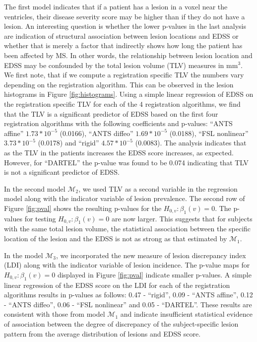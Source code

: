 \documentclass[10pt]{article}
\begin{document}
The first model indicates that if a patient has a lesion in a voxel near the ventricles, their disease
severity score may be higher than if they do not have a lesion. An
interesting question is whether the lower p-values in the last
analysis are indication of structural association between lesion
locations and EDSS or whether that is merely a factor that indirectly shows
how long the patient has been affected by MS. In other words, the
relationship between lesion location and EDSS may be confounded by
the total lesion volume (TLV) measures in mm$^3$. We first note, that if we compute a registration specific TLV the numbers vary depending on the registration algorithm. This can be observed in the lesion histograms in Figure \ref{fig:histograms}. Using a simple linear regression of EDSS on the registration specific TLV for each of the 4 registration algorithms, we find that the TLV is a significant predictor of EDSS
based on the first four registration algorithms with the following
coefficients and p-values: ``ANTS affine'' $1.73*10^{-5}$ (0.0166),
``ANTS diffeo'' $1.69*10^{-5}$ (0.0188), ``FSL nonlinear''
$3.73*10^{-5}$ (0.0178) and ``rigid'' $4.57*10^{-5}$ (0.0083). The
analysis indicates that as the TLV in the patients increases the
EDSS score increases, as expected. However, for ``DARTEL'' the p-value was found to be 0.074 indicating that TLV is not a significant predictor of EDSS. 

In the second model $\mathcal{M}_2$, we used  TLV as a second
variable in the regression model along with the indicator variable
of lesion prevalence. The second row of Figure \ref{fig:pval} shows
the resulting p-values for the $H_{0,v}:\beta_1(v)=0$. The p-values
for testing $H_{0,v}:\beta_1(v)=0$ are now larger. This suggests
that for subjects with the same total lesion volume, the statistical association
between the specific location of the lesion and the EDSS is not as
strong as that estimated by $\mathcal{M}_1$.

In the model $\mathcal{M}_3$, we incorporated the new measure of
lesion discrepancy index (LDI) along with the indicator variable of
lesion incidence. The p-value maps  for $H_{0,v}:\beta_1(v)=0$
displayed in Figure \ref{fig:pval} indicate smaller p-values. A
simple linear regression of the EDSS score on the LDI for each of
the registration algorithms results in p-values as follows: 0.47 -
``rigid'', 0.09 - ``ANTS affine'', 0.12 - ``ANTS diffeo'', 0.06 -
``FSL nonlinear'' and 0.05 - ``DARTEL''. These results are consistent with those from
model $\mathcal{M}_1$ and indicate insufficient statistical evidence of association between the degree of discrepancy
of the subject-specific lesion pattern from the average distribution of lesions and EDSS score.
\end{document}
